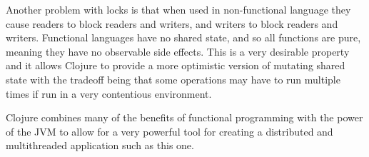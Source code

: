 Another problem with locks is that when used in non-functional language they cause 
readers to block readers and writers, and writers to block readers and writers. Functional 
languages have no shared state, and so all functions are pure, meaning they have no observable
side effects. This is a very desirable property and it allows Clojure to provide a more optimistic version
of mutating shared state with the tradeoff being that some operations may have to run multiple times if run 
in a very contentious environment.




Clojure combines many of the benefits of functional programming with the power of the JVM to allow for a very powerful tool for creating a distributed and multithreaded application such as this one.  





